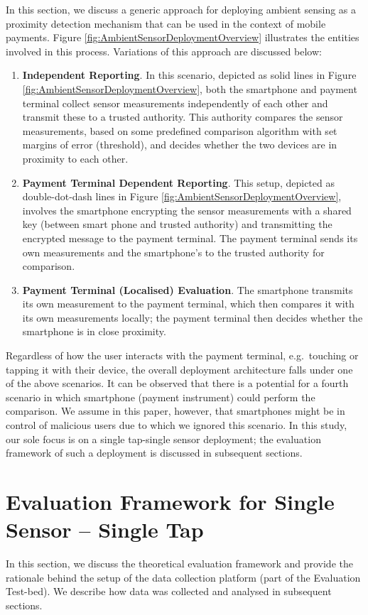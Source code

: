 \documentclass[runningheads,a4paper]{llncs}
\begin{document}
In this section, we discuss a generic approach for deploying ambient sensing as a proximity detection mechanism that can be used in the context of mobile payments. Figure \ref{fig:AmbientSensorDeploymentOverview} illustrates the entities involved in this process.  Variations of this approach are discussed below:
\begin{enumerate}
\item \textbf{Independent Reporting}.  In this scenario, depicted as solid lines in Figure \ref{fig:AmbientSensorDeploymentOverview}, both the smartphone and payment terminal collect sensor measurements independently of each other and transmit these to a trusted authority.  This authority compares the sensor measurements, based on some predefined comparison algorithm with set margins of error (threshold), and decides whether the two devices are in proximity to each other.
\item \textbf{Payment Terminal Dependent Reporting}.  This setup, depicted as double-dot-dash lines in Figure \ref{fig:AmbientSensorDeploymentOverview}, involves the smartphone encrypting the sensor measurements with a shared key (between smart phone and trusted authority) and transmitting the encrypted message to the payment terminal.  The payment terminal sends its own measurements and the smartphone's to the trusted authority for comparison.
\item \textbf{Payment Terminal (Localised) Evaluation}.  The smartphone transmits its own measurement to the payment terminal, which then compares it with its own measurements locally; the payment terminal then decides whether the smartphone is in close proximity. 
\end{enumerate}

Regardless of how the user interacts with the payment terminal, e.g.\ touching or tapping it with their device, the overall deployment architecture falls under one of the above scenarios.  It can be observed that there is a potential for a fourth scenario in which smartphone (payment instrument) could perform the comparison.  We assume in this paper, however, that smartphones might be in control of malicious users due to which we ignored this scenario.  In this study, our sole focus is on a single tap-single sensor deployment; the evaluation framework of such a deployment is discussed in subsequent sections. 

\section{Evaluation Framework for Single Sensor -- Single Tap}
\label{sec:Evaluation-Framework-for-Single-Sensor-Single-Tap}
In this section, we discuss the theoretical evaluation framework and provide the rationale behind the setup of the data collection platform (part of the Evaluation Test-bed). We describe how data was collected and analysed in subsequent sections. 
\end{document}
